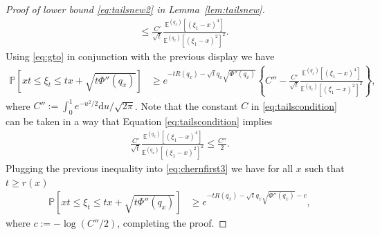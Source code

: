 \documentclass[a4,12pt]{amsart}
\numberwithin{equation}{section}
\begin{document}
\begin{appendix}
\begin{proof}[Proof of lower bound \eqref{eq:tailsnew2} in Lemma~\ref{lem:tailsnew}]
\begin{align*}
		&\leq \frac{C'}{\sqrt{t}} \frac{ \mathbb{E}^{(q_x)}[ (\xi_1 - x)^4 ] }{\mathbb{E}^{(q_x)}[ (\xi_1 - x)^2 ]^{2} }.
	\end{align*}
    Using \eqref{eq:gto} in conjunction with the previous display we have 
	\begin{align} \label{eq:chernfirst3}
		\mathbb{P}[xt\leq \xi_t \leq tx+ \sqrt{t\Phi''(q_x)}] &\geq e^{ - tR(q_x) - \sqrt{t}  q_x \sqrt{\Phi''(q_x) }}  
		\left\{ C'' - \frac{C'}{\sqrt{t}} \frac{ \mathbb{E}^{(q_x)}[ (\xi_1 - x)^4 ] }{\mathbb{E}^{(q_x)}[ (\xi_1 - x)^2 ]^2   } \right\},
	\end{align}
	where $C'' := \int_{0}^1 e^{ - u^2/2}\mathrm{d}u/\sqrt{2\pi}$. 
	Note that the constant $C$ in \eqref{eq:tailscondition} can be taken in a way that Equation \eqref{eq:tailscondition} implies
	\begin{align*} 
		\frac{C'}{\sqrt{t}} \frac{ \mathbb{E}^{(q_x)}[ (\xi_1 - x)^4 ] }{\mathbb{E}^{(q_x)}[ (\xi_1 - x)^2 ]^2   } \leq \frac{C''}{2}. 
	\end{align*}
	Plugging the previous inequality into \eqref{eq:chernfirst3} we have for all $x$ such that $t\geq r(x)$
	\begin{align*} 
		\mathbb{P}[xt\leq \xi_t \leq tx+ \sqrt{t\Phi''(q_x)}] &\geq e^{ - tR(q_x) - \sqrt{t} q_x \sqrt{\Phi''(q_x)} - c},
	\end{align*}
	where $c := -\log(C''/2)$, completing the proof. 
\end{proof}


\end{appendix}
\end{document}
